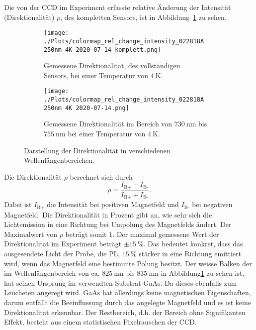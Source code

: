 Die von der CCD im Experiment erfasste relative Änderung der Intensität (Direktionalität) $\rho$,
des kompletten Sensors, ist in Abbildung~\ref{fig:rel_komplett} zu sehen.
\begin{figure}
    \begin{subfigure}{0.50\textwidth}
        \texttt{[image: ./Plots/colormap\_rel\_change\_intensity\_022818A 250nm 4K 2020-07-14\_komplett.png]}
        \caption{Gemessene Direktionalität, des vollständigen\\ Sensors, bei einer Temperatur von $\SI{4}{\kelvin}$.}
        \label{fig:rel_komplett}
    \end{subfigure}
    \begin{subfigure}{0.50\textwidth}
        \texttt{[image: ./Plots/colormap\_rel\_change\_intensity\_022818A 250nm 4K 2020-07-14.png]}
        \caption{Gemessene Direktionalität im Bereich von $\SI{730}{\nano\meter}$ bis $\SI{755}{\nano\meter}$
        bei einer Temperatur von $\SI{4}{\kelvin}$.}
        \label{fig:rel}
    \end{subfigure}
    \caption{Darstellung der Direktionalität in verschiedenen Wellenlängenbereichen.}
    \label{fig:rho}
\end{figure}
\FloatBarrier

Die Direktionalität $\rho$ berechnet sich durch 
\begin{equation}
    \rho = \frac{I_\text{B+} - I_\text{B-} }{ I_\text{B+} + I_\text{B-} }.
\end{equation}
Dabei ist $I_\text{B+}$ die Intensität bei positiven Magnetfeld und $I_\text{B-}$ bei negativen Magnetfeld.
Die Direktionalität in Prozent gibt an, wie sehr sich die Lichtemission in eine Richtung bei Umpolung des Magnetfelds ändert. 
Der Maximalwert von $\rho$ beträgt somit $1$.
Der maximal gemessene Wert der Direktionalität im Experiment beträgt $\pm \SI{15}{\percent}$. 
Das bedeutet konkret, dass das ausgesendete Licht der Probe, die PL, $\SI{15}{\percent}$ stärker in eine Richtung
emittiert wird, wenn das Magnetfeld eine bestimmte Polung besitzt.
Der weisse Balken der im Wellenlängenbereich von ca. $\SI{825}{\nano\meter}$ bis $\SI{835}{\nano\meter}$ 
in Abbildung\ref{fig:rel_komplett} zu sehen ist, 
hat seinen Ursprung im verwendten Substrat GaAs. Da dieses ebenfalls zum Leucheten angeregt wird.
GaAs hat allerdings keine magnetischen Eigenschaften, darum entfällt die Beeinflussung durch das angelegte Magnetfeld
und es ist keine Direktionalität erkennbar.
Der Restbereich, d.h. der Bereich ohne Signifikanten Effekt, besteht aus einem statistischen Pixelrauschen der CCD.

